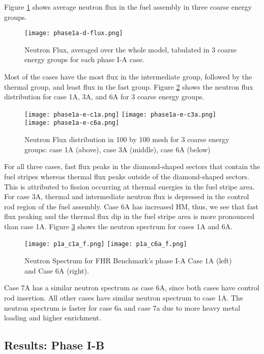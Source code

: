 Figure \ref{fig:phase1a-d} shows average neutron flux in the fuel assembly in 
three coarse energy groups. 
\begin{figure}[]
    \centering
    \texttt{[image: phase1a-d-flux.png]} 
    \caption{Neutron Flux, averaged over the whole model, tabulated in 3 coarse 
    energy groups for each phase I-A case. }
    \label{fig:phase1a-d}
\end{figure}
Most of the cases have the most flux in the intermediate group, followed by 
the thermal group, and least flux in the fast group.    
Figure \ref{fig:phase1a-e} shows the neutron flux distribution for case 1A, 
3A, and 6A for 3 coarse energy groups. 
\begin{figure}[]
    \centering
    \texttt{[image: phase1a-e-c1a.png]} 
    \texttt{[image: phase1a-e-c3a.png]} 
    \texttt{[image: phase1a-e-c6a.png]} 
    \caption{Neutron Flux distribution in 100 by 100 mesh for 3 coarse 
    energy groups: case 1A (above), case 3A (middle), case 6A (below) }
    \label{fig:phase1a-e}
\end{figure}
For all three cases, fast flux peaks in the diamond-shaped sectors that contain the 
fuel stripes whereas thermal flux peaks outside of the diamond-shaped sectors. 
This is attributed to fission occurring at thermal energies in the fuel stripe 
area. 
For case 3A, thermal and intermediate neutron flux is depressed in the control 
rod region of the fuel assembly.  
Case 6A has increased \gls{HM}, thus, we see that fast flux peaking and the thermal 
flux dip in the fuel stripe area is more pronounced than case 1A. 
Figure \ref{fig:phase1a-f} shows the neutron spectrum for cases 1A and 6A. 
\begin{figure}[]
    \centering
    \texttt{[image: p1a\_c1a\_f.png]} 
    \texttt{[image: p1a\_c6a\_f.png]} 
    \caption{Neutron Spectrum for \gls{FHR} Benchmark's phase I-A Case 1A 
    (left) and Case 6A (right).}
    \label{fig:phase1a-f}
\end{figure}
Case 7A has a similar neutron spectrum as case 6A, since both cases have 
control rod insertion. 
All other cases have similar neutron spectrum to case 1A.
The neutron spectrum is faster for case 6a and case 7a due to more heavy metal 
loading and higher enrichment.  

\subsection{Results: Phase I-B}


